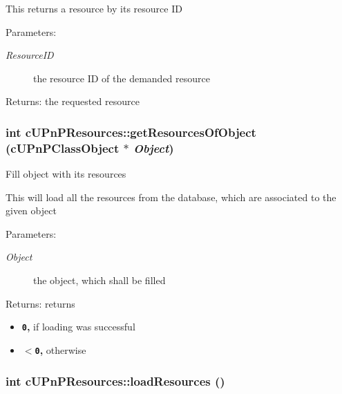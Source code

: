 This returns a resource by its resource ID

\begin{Desc}
\item[Parameters:]
\begin{description}
\item[{\em ResourceID}]the resource ID of the demanded resource \end{description}
\end{Desc}
\begin{Desc}
\item[Returns:]the requested resource \end{Desc}
 \hypertarget{classcUPnPResources_5da9137336fa284040a823f53267b837}{
\subsubsection[{getResourcesOfObject}]{\setlength{\rightskip}{0pt plus 5cm}int cUPnPResources::getResourcesOfObject ({\bf cUPnPClassObject} $\ast$ {\em Object})}}
\label{classcUPnPResources_5da9137336fa284040a823f53267b837}


Fill object with its resources

This will load all the resources from the database, which are associated to the given object

\begin{Desc}
\item[Parameters:]
\begin{description}
\item[{\em Object}]the object, which shall be filled \end{description}
\end{Desc}
\begin{Desc}
\item[Returns:]returns\begin{itemize}
\item {\bf {\tt 0},} if loading was successful\item {\bf {\tt $<$0},} otherwise \end{itemize}
\end{Desc}
\hypertarget{classcUPnPResources_eaffc72ee9faeb046a41b965ce61507f}{
\subsubsection[{loadResources}]{\setlength{\rightskip}{0pt plus 5cm}int cUPnPResources::loadResources ()}}
\label{classcUPnPResources_eaffc72ee9faeb046a41b965ce61507f}


